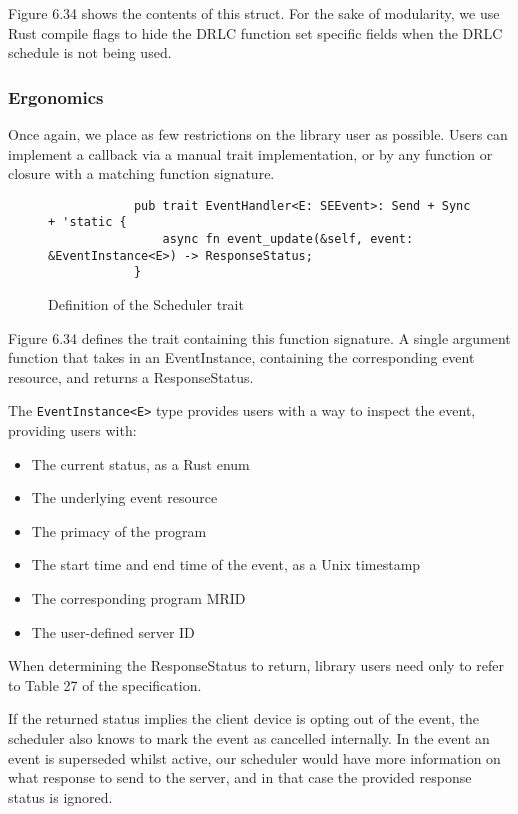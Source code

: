 Figure 6.34 shows the contents of this struct. For the sake of modularity, we use Rust compile flags to hide the DRLC function set specific fields when the DRLC schedule is not being used. 

\subsubsection{Ergonomics}
Once again, we place as few restrictions on the library user as possible. Users can implement a callback via a manual trait implementation, or by any function or closure with a matching function signature.

\begin{figure}[h]
    \begin{center}
        \begin{lstlisting}
            pub trait EventHandler<E: SEEvent>: Send + Sync + 'static {
                async fn event_update(&self, event: &EventInstance<E>) -> ResponseStatus;
            }
        \end{lstlisting}
        \label{fig:schedulertrait}
        \vspace{-10pt}
        \caption{Definition of the Scheduler trait}
    \end{center}
\end{figure}

Figure 6.34 defines the trait containing this function signature. A single argument function that takes in an EventInstance, containing the corresponding event resource, and returns a ResponseStatus. 

The \texttt{EventInstance<E>} type provides users with a way to inspect the event, providing users with:

\begin{itemize}
    \item The current status, as a Rust enum
    \item The underlying event resource
    \item The primacy of the program
    \item The start time and end time of the event, as a Unix timestamp
    \item The corresponding program MRID
    \item The user-defined server ID
\end{itemize}

When determining the ResponseStatus to return, library users need only to refer to Table 27 of the specification.

If the returned status implies the client device is opting out of the event, the scheduler also knows to mark the event as cancelled internally. In the event an event is superseded whilst active, our scheduler would have more information on what response to send to the server, and in that case the provided response status is ignored.

